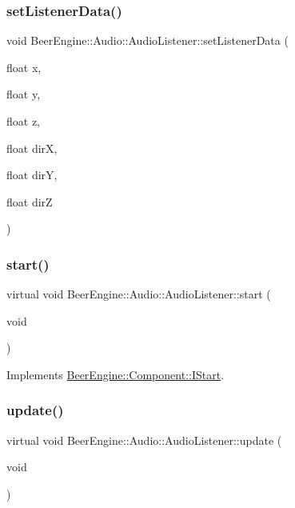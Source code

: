 \subsubsection{\texorpdfstring{set\+Listener\+Data()}{setListenerData()}}
{\footnotesize\ttfamily void Beer\+Engine\+::\+Audio\+::\+Audio\+Listener\+::set\+Listener\+Data (\begin{DoxyParamCaption}\item[{float}]{x,  }\item[{float}]{y,  }\item[{float}]{z,  }\item[{float}]{dirX,  }\item[{float}]{dirY,  }\item[{float}]{dirZ }\end{DoxyParamCaption})}

\mbox{\label{class_beer_engine_1_1_audio_1_1_audio_listener_a1d4d5e21f30edb7dba64e87f0712c3b3}} 
\subsubsection{\texorpdfstring{start()}{start()}}
{\footnotesize\ttfamily virtual void Beer\+Engine\+::\+Audio\+::\+Audio\+Listener\+::start (\begin{DoxyParamCaption}\item[{void}]{ }\end{DoxyParamCaption})\hspace{0.3cm}{\ttfamily [virtual]}}



Implements \mbox{\hyperlink{class_beer_engine_1_1_component_1_1_i_start_aa3e25e86e20c46cdaefc6f6d7f21e495}{Beer\+Engine\+::\+Component\+::\+I\+Start}}.

\mbox{\label{class_beer_engine_1_1_audio_1_1_audio_listener_a32c348d619ff2ca57d16af803d7dfcfd}} 
\subsubsection{\texorpdfstring{update()}{update()}}
{\footnotesize\ttfamily virtual void Beer\+Engine\+::\+Audio\+::\+Audio\+Listener\+::update (\begin{DoxyParamCaption}\item[{void}]{ }\end{DoxyParamCaption})\hspace{0.3cm}{\ttfamily [virtual]}}



